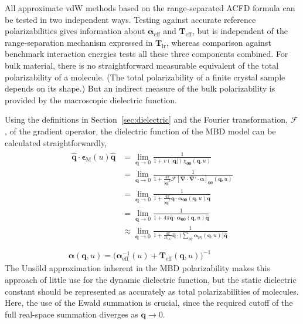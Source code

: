 All approximate vdW methods based on the range-separated ACFD formula can be tested in two independent ways.
Testing against accurate reference polarizabilities gives information about $\boldsymbol\alpha_\text{eff}$ and $\mathbf T_\text{eff}$, but is independent of the range-separation mechanism expressed in $\mathbf T_\text{lr}$, whereas comparison against benchmark interaction energies tests all these three components combined.
For bulk material, there is no straightforward measurable equivalent of the total polarizability of a molecule.
(The total polarizability of a finite crystal sample depends on its shape.)
But an indirect measure of the bulk polarizability is provided by the macroscopic dielectric function.

Using the definitions in Section~\ref{sec:dielectric} and the Fourier transformation, $\mathcal F$, of the gradient operator, the dielectric function of the MBD model can be calculated straightforwardly,
\begin{gather}
\begin{aligned}
  \hat{\mathbf q}\cdot\boldsymbol\epsilon_\text{M}(u)\hat{\mathbf q}&=\lim_{\mathbf q\rightarrow0}\frac1{1+v(|\mathbf q|)\chi_{\mathbf 0\mathbf 0}(\mathbf q,u)} \\
  &=\lim_{\mathbf q\rightarrow0}\frac1{1+\frac{4\pi}{|\mathbf q|^2}\mathcal F[\boldsymbol\nabla\cdot\boldsymbol\nabla'\cdot\boldsymbol\alpha]_{\mathbf 0\mathbf 0}(\mathbf q,u)} \\
  &=\lim_{\mathbf q\rightarrow0}\frac1{1+\frac{4\pi}{|\mathbf q|^2}\mathbf q\cdot\boldsymbol\alpha_{\mathbf 0\mathbf 0}(\mathbf q,u)\mathbf q} \\
  &=\lim_{\mathbf q\rightarrow0}\frac1{1+4\pi\hat{\mathbf q}\cdot\boldsymbol\alpha_{\mathbf 0\mathbf 0}(\mathbf q,u)\hat{\mathbf q}} \\
  &\approx\lim_{\mathbf q\rightarrow0}\frac1{1+\frac{4\pi}{\Omega_\text{UC}}\hat{\mathbf q}\cdot\big(\sum_{pq}\boldsymbol\alpha_{pq}(\mathbf q,u)\!\big)\hat{\mathbf q}} \\
\end{aligned} \\
\boldsymbol\alpha(\mathbf q,u)=\big(\boldsymbol\alpha_\text{eff}^{-1}(u)+\mathbf T_\text{eff}(\mathbf q,u)\!\big)^{-1}
\end{gather}
The Unsöld approximation inherent in the MBD polarizability makes this approach of little use for the dynamic dielectric function, but the static dielectric constant should be represented as accurately as total polarizabilities of molecules.
Here, the use of the Ewald summation is crucial, since the required cutoff of the full real-space summation diverges as $\mathbf q\rightarrow0$.

